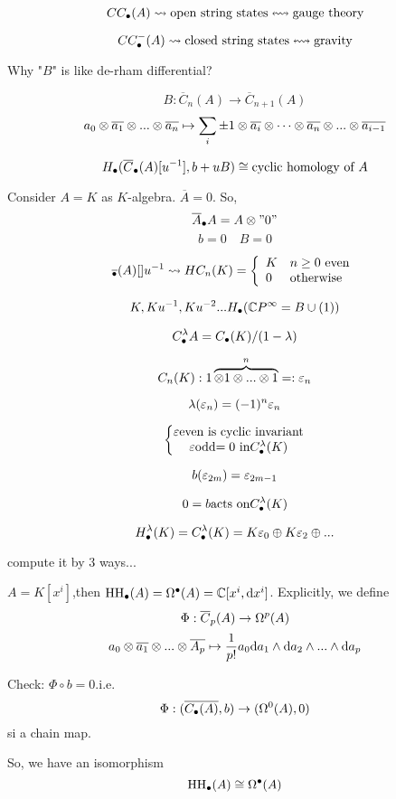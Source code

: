 $$CC_{\bullet}(A)\rightsquigarrow
\text{open string states}\leftrightsquigarrow\text{gauge theory}$$

$$CC^-_{\bullet}(A)\rightsquigarrow
\text{closed string states}\leftrightsquigarrow\text{gravity}$$

Why "$B$" is like de-rham differential?


$$B:\overline{C}_n(A)\to\overline{C}_{n+1}(A)$$
$$a_0\otimes\overline{a_1}\otimes...\otimes\overline{a_n}
\mapsto\sum_i\pm1\otimes\overline{a_i}
\otimes\cdots\otimes\overline{a_n}\otimes...\otimes\overline{a_{i-1}}$$

$$H_{\bullet}(\overline{C}_{\bullet}(A)[u^{-1}],b+uB)
\cong\text{cyclic homology of $A$}$$

\begin{example}
Consider $A=K$ as $K$-algebra.
$\overline{A}=0$.
So,
$$\overline{A}_{\bullet} A=A\otimes "0"$$
$$b=0\quad B=0$$

$$\overline{_{\bullet}}(A)[]u^{-1}\rightsquigarrow HC_n(K)=
\left\{\begin{array}{ll}
K & \text{$n\geq 0$ even}\\
0 & \text{otherwise}
\end{array}\right.$$

$$K,Ku^{-1},Ku^{-2}...H_{\bullet}(\mathbb{C} P^{\infty}=B\cup(1))$$

$$C^{\lambda}_{\bullet} A=C_{\bullet}(K)/(1-\lambda)$$

$$C_n(K):1\overbrace{\otimes1\otimes...\otimes1}^{n}=:\varepsilon_n$$

$$\lambda(\varepsilon_n)=(-1)^n\varepsilon_n$$

$$\left\{
\begin{matrix}
\varepsilon\text{even is cyclic invariant}\\
\varepsilon\text{odd$=0$ in} C_{\bullet}^{\lambda}(K)
\end{matrix}
\right.
$$

$$b(\varepsilon_{2m})=\varepsilon_{2m-1}$$

$$0=b\text{acts on} C^{\lambda}_{\bullet}(K)$$

$$H^{\lambda}_{\bullet}(K)=C_{\bullet}^{\lambda}(K)=
K\varepsilon_0\oplus K\varepsilon_2\oplus...$$

compute it by 3 ways...

\end{example}

\begin{example}
$A=K[x^i]$,then $\operatorname{HH}_{\bullet}(A)=\Omega^{\bullet}(A)=\mathbb{C}[x^i,\mathrm{d} x^i]$.
Explicitly, we define
$$\Phi:\overline{C}_p(A)\to \Omega^p(A)$$
$$a_0\otimes\overline{a_1}\otimes...\otimes\overline{A_p}
\mapsto \frac{1}{p!}
a_0\mathrm{d} a_1\wedge\mathrm{d} a_2\wedge...\wedge\mathrm{d} a_p$$

Check: $\Phi\circ b=0$.i.e.
$$\Phi:(\overline{C_{\bullet}(A)},b)\to(\Omega^0(A),0)$$
si a chain map.

So, we have an isomorphism
$$\operatorname{HH}_{\bullet}(A)\cong \Omega^{\bullet} (A)$$
\end{example}

